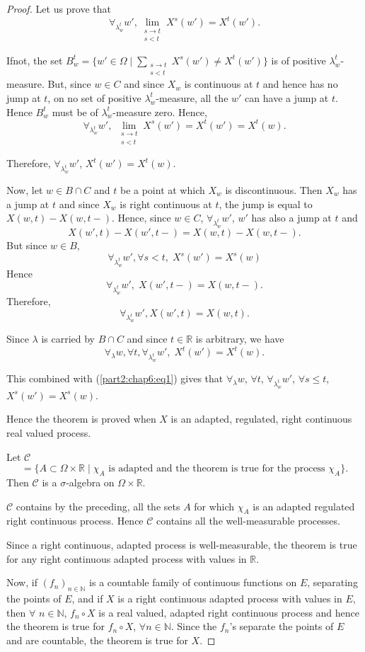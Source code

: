 \begin{proof}
Let us prove that 
$$
\forall_{\lambda^t_w} w', \lim\limits_{\substack{s \to t\\s<t}}
X^s(w') = X^t(w'). 
$$

If\pageoriginale  not, the set $B^t_w = \{w' \in \Omega \mid
\sum\limits_{\substack{s\to t\\ s<t}} X^s (w') \neq X^t (w')\}$ is of
positive $\lambda^t_w$-measure. But, since $w \in C$ and since $X_w$
is continuous at $t$ and hence has no jump at $t$, on no set of
positive $\lambda^t_w$-measure, all the $w'$ can have a jump at
$t$. Hence $B^t_w$ must be of $\lambda^t_w$-measure zero. Hence, 
$$
\forall_{\lambda^t_w} w', \; \lim\limits_{\substack{s \to t\\s<t}}
X^s(w') = X^t (w') = X^t (w). 
$$

Therefore, $\forall_{\lambda^t_w} w'$, $X^t(w') = X^t(w)$. 

Now, let $w \in B\cap C$ and $t$ be a point at which $X_w$ is
discontinuous. Then $X_w$ has a jump at $t$ and since $X_w$ is right
continuous at $t$, the jump is equal to $X(w,t) - X(w, t-)$. Hence,
since $w \in C$, $\forall_{\lambda^t_w} w'$, $w'$ has also a jump at
$t$ and 
$$
X (w',t) - X(w', t-) = X(w,t) - X(w,t-).
$$
But since $w \in B$, 
$$
\forall_{\lambda^t_w} w', \forall s < t, \; X^s(w') = X^s(w)
$$
Hence
$$
\forall_{\lambda^t_w} w', \; X (w', t-) = X(w,t-). 
$$
Therefore,
$$
\forall_{\lambda^t_w} w', X(w',t) = X(w,t). 
$$

Since $\lambda$ is carried by $B \cap C$ and since $t \in \mathbb{R}$
is arbitrary, we have
$$
\forall_\lambda w, \forall t, \forall_{\lambda^t_w} w', \; X^t(w') =
X^t(w). 
$$

This combined with (\ref{part2:chap6:eq1}) gives that $\forall_\lambda w$, $\forall t$,
$\forall_{\lambda^t_w} w'$, $\forall s \leq t$, $X^s(w') = X^s(w)$. 

Hence the theorem is proved when $X$ is an adapted, regulated, right
continuous real valued process. 

Let $\mathscr{C}$\pageoriginale
$$
= \{ A \subset \Omega \times \mathbb{R} \mid \chi_A \text{ is adapted
  and the theorem is true for the process } \chi_A\}.
$$
Then $\mathscr{C}$ is a $\sigma$-algebra on $\Omega \times
\mathbb{R}$. 

$\mathscr{C}$ contains by the preceding, all the sets $A$ for which
$\chi_A$ is an adapted regulated right continuous process. Hence
$\mathscr{C}$ contains all the well-measurable processes.

Since a right continuous, adapted process is well-measurable, the
theorem is true for any right continuous adapted process with values
in $\mathbb{R}$.

Now, if $(f_n)_{n \in \mathbb{N}}$ is a countable family of continuous
functions on $E$, separating the points of $E$, and if $X$ is a right
continuous adapted process with values in $E$, then $\forall$ $n \in
\mathbb{N}$, $f_n \circ X$ is a real valued, adapted right continuous
process and hence the theorem is true for $f_n \circ X$, $\forall n\in
\mathbb{N}$. Since the $f_n$'s separate the points of $E$ and are
countable, the theorem is true for $X$. 
\end{proof}

